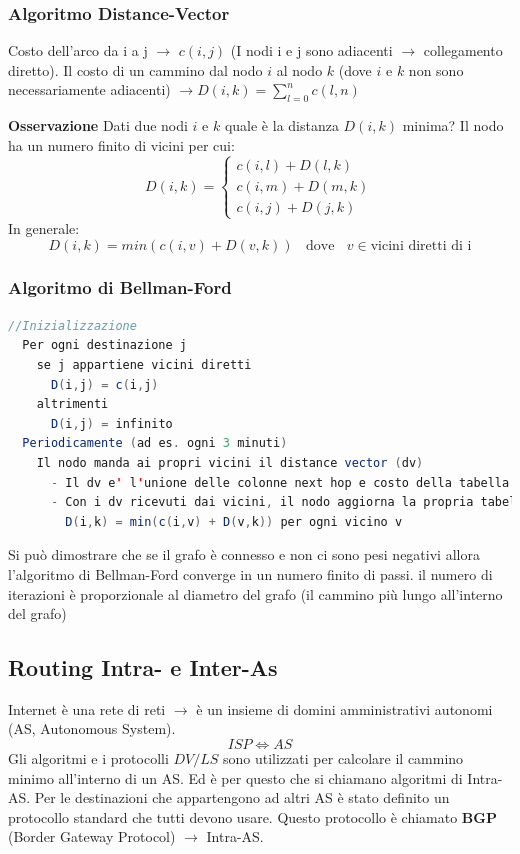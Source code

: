 \documentclass[a4paper]{article}
\begin{document}
\subsubsection{Algoritmo Distance-Vector}

Costo dell'arco da i a j $\rightarrow$ $c(i,j)$ (I nodi i e j sono adiacenti $\rightarrow$ collegamento diretto).
Il costo di un cammino dal nodo $i$ al nodo $k$ (dove $i$ e $k$ non sono necessariamente adiacenti) 
$\rightarrow D(i,k) = \sum_{l = 0}^{n} c(l,n)$ 

\vspace{1em}
\noindent
\textbf{Osservazione}
Dati due nodi $i$ e $k$ quale è la distanza $D(i, k)$ minima?
Il nodo ha un numero finito di vicini per cui:
\[D(i,k) = \begin{cases}
  c(i,l) + D(l,k)\\
  c(i,m) + D(m,k)\\
  c(i,j) + D(j,k)
\end{cases}\]
In generale:
\[D(i,k) = min(c(i,v) + D(v,k)) \; \; \text{ dove } \; \; v \in \text{vicini diretti di i}\]
\subsubsection{Algoritmo di Bellman-Ford}
\begin{lstlisting}[language=Scala]
  //Inizializzazione
  Per ogni destinazione j
    se j appartiene vicini diretti 
      D(i,j) = c(i,j)
    altrimenti
      D(i,j) = infinito
  Periodicamente (ad es. ogni 3 minuti)
    Il nodo manda ai propri vicini il distance vector (dv)
      - Il dv e' l'unione delle colonne next hop e costo della tabella di routing del nodo
      - Con i dv ricevuti dai vicini, il nodo aggiorna la propria tabella di routing per ogni destinaizone
        D(i,k) = min(c(i,v) + D(v,k)) per ogni vicino v
\end{lstlisting}
\noindent
Si può dimostrare che se il grafo è connesso e non ci sono pesi negativi allora l'algoritmo di Bellman-Ford converge in un numero finito di passi.
il numero di iterazioni è proporzionale al diametro del grafo (il cammino più lungo all'interno del grafo)

\subsection{Routing Intra- e Inter-As}
Internet è una rete di reti $\rightarrow$ è un insieme di domini amministrativi autonomi (AS, Autonomous System). 
\[ISP \Longleftrightarrow AS \]
Gli algoritmi e i protocolli $DV/LS$ sono utilizzati per calcolare il cammino minimo all'interno di un AS. Ed è per questo che si chiamano algoritmi di Intra-AS.
Per le destinazioni che appartengono ad altri AS è stato definito un protocollo standard che tutti devono usare. Questo protocollo è chiamato \textbf{BGP} (Border Gateway Protocol) $\rightarrow$ Intra-AS.
\end{document}
